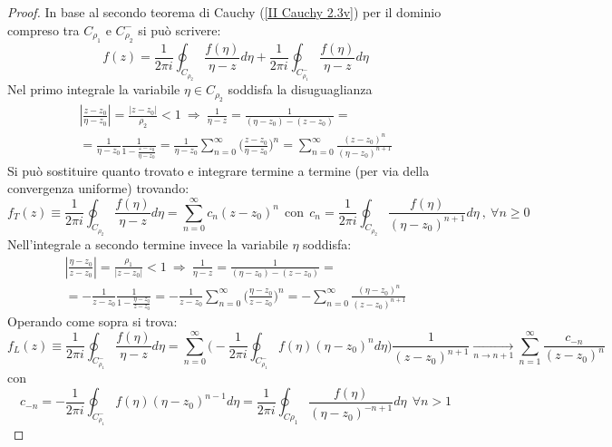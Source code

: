 \documentclass[twoside]{article}
\begin{document}
\begin{proof}
In base al secondo teorema di Cauchy (\ref{II Cauchy 2.3v}) per il dominio compreso tra $C_{\rho_1}$ e $C^- _{\rho_2}$ si può scrivere:
\begin{equation}
    f(z)=\frac{1}{2\pi i}\oint_{C_{\rho_2}} \frac{f(\eta)}{\eta - z}d\eta + \frac{1}{2\pi i}\oint_{C_{\rho_1}^-}\frac{f(\eta)}{\eta-z}d\eta
\end{equation}
Nel primo integrale la variabile $\eta \in C_{\rho_2}$ soddisfa la disuguaglianza
\begin{equation} \begin{split}
    \left|\frac{z-z_0}{\eta-z_0}\right|=\frac{|z-z_0|}{\rho_2}<1 \ \Rightarrow \ \frac{1}{\eta - z}=\frac{1}{(\eta-z_0)-(z-z_0)}= \\ =\frac{1}{\eta - z_0}\frac{1}{1-\frac{z-z_0}{\eta - z_0}}=\frac{1}{\eta - z_0}\sum_{n=0}^{\infty}\biggl( \frac{z-z_0}{\eta-z_0} \biggr) ^n=\sum_{n=0}^{\infty}\frac{(z-z_0)^n}{(\eta-z_0)^{n+1}}
\end{split}\end{equation}
Si può sostituire quanto trovato e integrare termine a termine (per via della convergenza uniforme) trovando:
\begin{equation}
    f_T(z)\equiv \frac{1}{2\pi i}\oint_{C_{\rho_2}} \frac{f(\eta)}{\eta - z}d\eta=\sum_{n=0}^{\infty}c_n(z-z_0)^n \ \ \text{con} \ \ c_n=\frac{1}{2\pi i}\oint_{C_{\rho_2}}\frac{f(\eta)}{(\eta-z_0)^{n+1}}d\eta \ , \ \forall n\geq 0
\end{equation}
Nell'integrale a secondo termine invece la variabile $\eta$ soddisfa:
\begin{equation}
    \begin{split}
        \left|\frac{\eta-z_0}{z-z_0}\right|=\frac{\rho_1}{|z-z_0|}<1 \ \Rightarrow \ \frac{1}{\eta-z}=\frac{1}{(\eta-z_0)-(z-z_0)}=\\
        =-\frac{1}{z-z_0}\frac{1}{1-\frac{\eta-z_0}{z-z_0}}=-\frac{1}{z-z_0}\sum_{n=0}^{\infty} \biggl( \frac{\eta-z_0}{z-z_0} \biggr)^n=-\sum_{n=0}^{\infty}\frac{(\eta-z_0)^n}{(z-z_0)^{n+1}}
    \end{split}
\end{equation}
Operando come sopra si trova:
\begin{equation}
    f_L(z)\equiv \frac{1}{2\pi i}\oint_{C_{\rho_1}^-}\frac{f(\eta)}{\eta-z}d\eta=\sum_{n=0}^{\infty}\biggl(-\frac{1}{2\pi i}\oint_{C_{\rho_1}^-}f(\eta)(\eta-z_0)^n d\eta \biggr) \frac{1}{(z-z_0)^{n+1}}\xrightarrow[n \to n+1]\ \sum_{n=1}^{\infty}\frac{c_{-n}}{(z-z_0)^n}
\end{equation}
con
\begin{equation}
  c_{-n}=-\frac{1}{2\pi i}\oint_{C_{\rho_1}^-} f(\eta)(\eta -z_0)^{n-1}d\eta=\frac{1}{2\pi i}\oint_{C{\rho_1}}\frac{f(\eta)}{(\eta-z_0)^{-n+1}}d\eta \ \ \forall n>1
\end{equation}


\end{proof}
\end{document}
